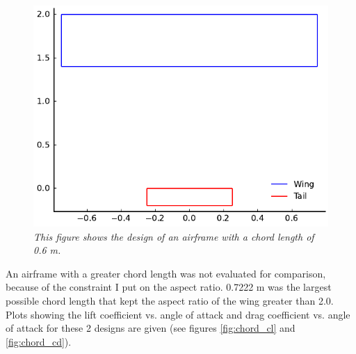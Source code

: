 \documentclass{journal}
\begin{document}
	\begin{figure}[H]
		\includegraphics{../graphics/chord_design.pdf}
		\caption{\emph{This figure shows the design of an airframe with a chord length of 0.6 m.}}
		\label{fig:chord_design}
	\end{figure}
	
	An airframe with a greater chord length was not evaluated for comparison, because of the constraint I put on the aspect ratio. 0.7222 m was the largest possible chord length that kept the aspect ratio of the wing greater than 2.0.\\
	
	Plots showing the lift coefficient vs. angle of attack and drag coefficient vs. angle of attack for these 2 designs are given (see figures \ref{fig:chord_cl} and \ref{fig:chord_cd}).
	
\end{document}
